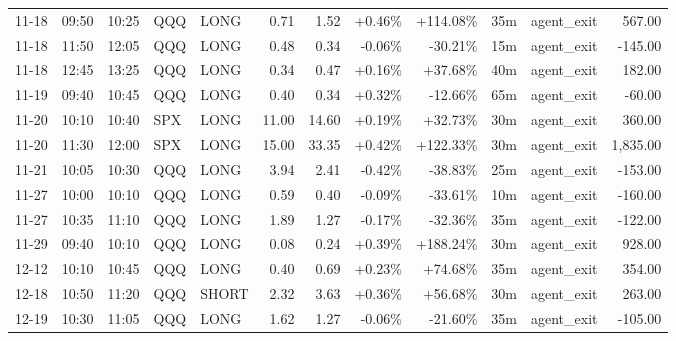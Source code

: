 \documentclass[11pt,a4paper,twoside]{article}
\begin{document}
\begin{center}
\begin{longtable}{>{\color{txtmain}}l l l l l r r r r r >{\color{txtmain}}l r}
11-18 & 09:50 & 10:25 & QQQ & LONG & 0.71 & 1.52 & \textcolor{wingreen}{+0.46\%} & \textcolor{wingreen}{+114.08\%} & 35m & agent\_exit & \textcolor{wingreen}{567.00} \\
11-18 & 11:50 & 12:05 & QQQ & LONG & 0.48 & 0.34 & \textcolor{lossred}{-0.06\%} & \textcolor{lossred}{-30.21\%} & 15m & agent\_exit & \textcolor{lossred}{-145.00} \\
11-18 & 12:45 & 13:25 & QQQ & LONG & 0.34 & 0.47 & \textcolor{wingreen}{+0.16\%} & \textcolor{wingreen}{+37.68\%} & 40m & agent\_exit & \textcolor{wingreen}{182.00} \\
11-19 & 09:40 & 10:45 & QQQ & LONG & 0.40 & 0.34 & \textcolor{wingreen}{+0.32\%} & \textcolor{lossred}{-12.66\%} & 65m & agent\_exit & \textcolor{lossred}{-60.00} \\
11-20 & 10:10 & 10:40 & SPX & LONG & 11.00 & 14.60 & \textcolor{wingreen}{+0.19\%} & \textcolor{wingreen}{+32.73\%} & 30m & agent\_exit & \textcolor{wingreen}{360.00} \\
11-20 & 11:30 & 12:00 & SPX & LONG & 15.00 & 33.35 & \textcolor{wingreen}{+0.42\%} & \textcolor{wingreen}{+122.33\%} & 30m & agent\_exit & \textcolor{wingreen}{1,835.00} \\
11-21 & 10:05 & 10:30 & QQQ & LONG & 3.94 & 2.41 & \textcolor{lossred}{-0.42\%} & \textcolor{lossred}{-38.83\%} & 25m & agent\_exit & \textcolor{lossred}{-153.00} \\
11-27 & 10:00 & 10:10 & QQQ & LONG & 0.59 & 0.40 & \textcolor{lossred}{-0.09\%} & \textcolor{lossred}{-33.61\%} & 10m & agent\_exit & \textcolor{lossred}{-160.00} \\
11-27 & 10:35 & 11:10 & QQQ & LONG & 1.89 & 1.27 & \textcolor{lossred}{-0.17\%} & \textcolor{lossred}{-32.36\%} & 35m & agent\_exit & \textcolor{lossred}{-122.00} \\
11-29 & 09:40 & 10:10 & QQQ & LONG & 0.08 & 0.24 & \textcolor{wingreen}{+0.39\%} & \textcolor{wingreen}{+188.24\%} & 30m & agent\_exit & \textcolor{wingreen}{928.00} \\
12-12 & 10:10 & 10:45 & QQQ & LONG & 0.40 & 0.69 & \textcolor{wingreen}{+0.23\%} & \textcolor{wingreen}{+74.68\%} & 35m & agent\_exit & \textcolor{wingreen}{354.00} \\
12-18 & 10:50 & 11:20 & QQQ & SHORT & 2.32 & 3.63 & \textcolor{wingreen}{+0.36\%} & \textcolor{wingreen}{+56.68\%} & 30m & agent\_exit & \textcolor{wingreen}{263.00} \\
12-19 & 10:30 & 11:05 & QQQ & LONG & 1.62 & 1.27 & \textcolor{lossred}{-0.06\%} & \textcolor{lossred}{-21.60\%} & 35m & agent\_exit & \textcolor{lossred}{-105.00} \\

\end{longtable}
\end{center}
\end{document}
